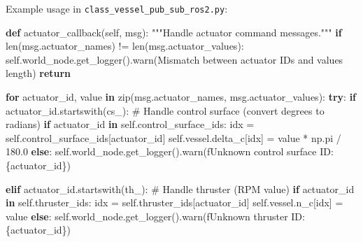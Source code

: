 \documentclass[
  letterpaper,
  DIV=11,
  numbers=noendperiod]{scrreprt}
\newenvironment{Shaded}{\begin{snugshade}}{\end{snugshade}}
\newcommand{\BuiltInTok}[1]{\textcolor[rgb]{0.00,0.23,0.31}{#1}}
\newcommand{\CommentTok}[1]{\textcolor[rgb]{0.37,0.37,0.37}{#1}}
\newcommand{\ControlFlowTok}[1]{\textcolor[rgb]{0.00,0.23,0.31}{\textbf{#1}}}
\newcommand{\FloatTok}[1]{\textcolor[rgb]{0.68,0.00,0.00}{#1}}
\newcommand{\KeywordTok}[1]{\textcolor[rgb]{0.00,0.23,0.31}{\textbf{#1}}}
\newcommand{\NormalTok}[1]{\textcolor[rgb]{0.00,0.23,0.31}{#1}}
\newcommand{\OperatorTok}[1]{\textcolor[rgb]{0.37,0.37,0.37}{#1}}
\newcommand{\SpecialCharTok}[1]{\textcolor[rgb]{0.37,0.37,0.37}{#1}}
\newcommand{\SpecialStringTok}[1]{\textcolor[rgb]{0.13,0.47,0.30}{#1}}
\newcommand{\StringTok}[1]{\textcolor[rgb]{0.13,0.47,0.30}{#1}}
\newcommand{\VariableTok}[1]{\textcolor[rgb]{0.07,0.07,0.07}{#1}}
\begin{document}
Example usage in \texttt{class\_vessel\_pub\_sub\_ros2.py}:

\begin{Shaded}
\begin{Highlighting}[]
\KeywordTok{def}\NormalTok{ actuator\_callback(}\VariableTok{self}\NormalTok{, msg):}
    \CommentTok{"""Handle actuator command messages."""}
    \ControlFlowTok{if} \BuiltInTok{len}\NormalTok{(msg.actuator\_names) }\OperatorTok{!=} \BuiltInTok{len}\NormalTok{(msg.actuator\_values):}
        \VariableTok{self}\NormalTok{.world\_node.get\_logger().warn(}\StringTok{\textquotesingle{}Mismatch between actuator IDs and values length\textquotesingle{}}\NormalTok{)}
        \ControlFlowTok{return}
        
    \ControlFlowTok{for}\NormalTok{ actuator\_id, value }\KeywordTok{in} \BuiltInTok{zip}\NormalTok{(msg.actuator\_names, msg.actuator\_values):}
        \ControlFlowTok{try}\NormalTok{:}
            \ControlFlowTok{if}\NormalTok{ actuator\_id.startswith(}\StringTok{\textquotesingle{}cs\_\textquotesingle{}}\NormalTok{):}
                \CommentTok{\# Handle control surface (convert degrees to radians)}
                \ControlFlowTok{if}\NormalTok{ actuator\_id }\KeywordTok{in} \VariableTok{self}\NormalTok{.control\_surface\_ids:}
\NormalTok{                    idx }\OperatorTok{=} \VariableTok{self}\NormalTok{.control\_surface\_ids[actuator\_id]}
                    \VariableTok{self}\NormalTok{.vessel.delta\_c[idx] }\OperatorTok{=}\NormalTok{ value }\OperatorTok{*}\NormalTok{ np.pi }\OperatorTok{/} \FloatTok{180.0}
                \ControlFlowTok{else}\NormalTok{:}
                    \VariableTok{self}\NormalTok{.world\_node.get\_logger().warn(}\SpecialStringTok{f\textquotesingle{}Unknown control surface ID: }\SpecialCharTok{\{}\NormalTok{actuator\_id}\SpecialCharTok{\}}\SpecialStringTok{\textquotesingle{}}\NormalTok{)}
                    
            \ControlFlowTok{elif}\NormalTok{ actuator\_id.startswith(}\StringTok{\textquotesingle{}th\_\textquotesingle{}}\NormalTok{):}
                \CommentTok{\# Handle thruster (RPM value)}
                \ControlFlowTok{if}\NormalTok{ actuator\_id }\KeywordTok{in} \VariableTok{self}\NormalTok{.thruster\_ids:}
\NormalTok{                    idx }\OperatorTok{=} \VariableTok{self}\NormalTok{.thruster\_ids[actuator\_id]}
                    \VariableTok{self}\NormalTok{.vessel.n\_c[idx] }\OperatorTok{=}\NormalTok{ value}
                \ControlFlowTok{else}\NormalTok{:}
                    \VariableTok{self}\NormalTok{.world\_node.get\_logger().warn(}\SpecialStringTok{f\textquotesingle{}Unknown thruster ID: }\SpecialCharTok{\{}\NormalTok{actuator\_id}\SpecialCharTok{\}}\SpecialStringTok{\textquotesingle{}}\NormalTok{)}
                    

\end{Highlighting}
\end{Shaded}
\end{document}
